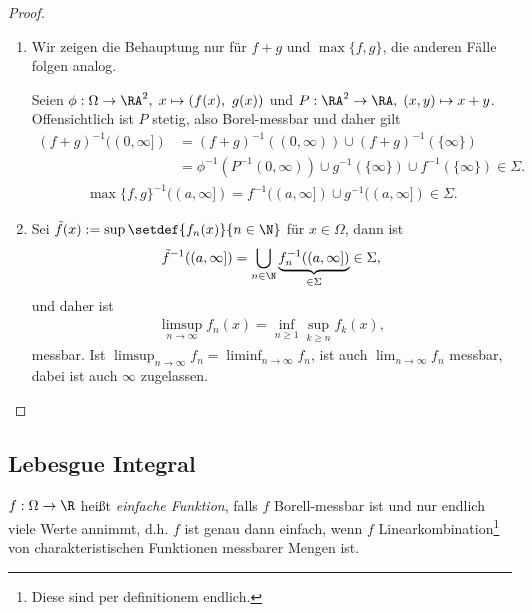 \begin{proof}
\begin{enumerate}[label=\arabic{*}.)]
  \item Wir zeigen die Behauptung nur für $f+g$ und $\max\{f,g\}$, die anderen
  Fälle folgen analog.
  
  Seien $\phi: \Omega\to\RA^2,\;x\mapsto (f(x),\ g(x))$ und  
$P: \RA^2\to
  \RA,\;(x,y)\mapsto x+y$. Offensichtlich ist $P$ stetig, also Borel-messbar und
  daher gilt
  \begin{align*}
  (f+g)^{-1}((0,\infty]) &= (f+g)^{-1}((0,\infty))\cup (f+g)^{-1}(\{\infty\})
  \\&= \phi^{-1}(P^{-1}(0,\infty))\cup g^{-1}(\{\infty\})\cup f^{-1}(\{\infty\})
   \in\Sigma.
  \end{align*}
\begin{align*}
\max\{f,g\}^{-1}((a,\infty]) = f^{-1}((a,\infty])\cup
g^{-1}((a,\infty])\in\Sigma.
\end{align*}
\item Sei $\tilde{f}(x) := \sup \setdef{f_n(x)}{n\in\N}$ für $x\in\Omega$,
dann ist
\begin{align*}
\tilde{f}^{-1}((a,\infty]) = \bigcup_{n\in\N}
\underbrace{f_n^{-1}((a,\infty])}_{\in\Sigma}\in \Sigma,
\end{align*}
und daher ist
\begin{align*}
\limsup_{n\to\infty} f_n(x) = \inf_{n\ge 1}\sup_{k\ge n} f_k(x),
\end{align*}
messbar. Ist $\limsup_{n\to\infty} f_n = \liminf_{n\to\infty} f_n$, ist auch
$\lim_{n\to\infty} f_n$ messbar, dabei ist auch $\infty$ zugelassen.\qedhere
\end{enumerate}
\end{proof}

\subsection{Lebesgue Integral}

\begin{defn}
\label{defn:3.25} $f:\Omega\to\R$ heißt \emph{einfache Funktion}, falls $f$
Borell-messbar ist und nur endlich viele Werte annimmt, d.h. $f$ ist genau dann
einfach, wenn $f$ Linearkombination\footnote{Diese sind per definitionem
endlich.} von charakteristischen Funktionen messbarer Mengen ist.\fishhere
\end{defn}

